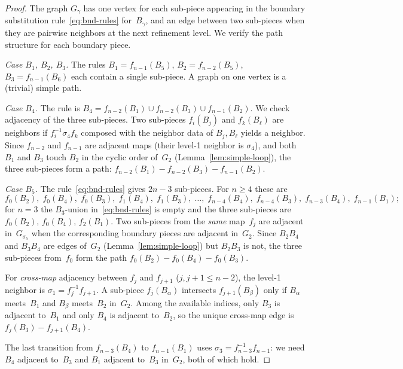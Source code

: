 \documentclass{amsart}
\theoremstyle{definition}
\theoremstyle{remark}
\begin{document}
\begin{proof}
The graph $G_\gamma$ has one vertex for each sub-piece appearing
in the boundary substitution rule~\eqref{eq:bnd-rules} for~$B_\gamma$,
and an edge between two sub-pieces when they are pairwise neighbors at
the next refinement level.  We verify the path structure for each
boundary piece.

\emph{Case $B_1$, $B_2$, $B_3$.}
The rules $B_1 = f_{n-1}(B_5)$,\; $B_2 = f_{n-2}(B_5)$,\;
$B_3 = f_{n-1}(B_6)$ each contain a single sub-piece.  A graph on one
vertex is a (trivial) simple path.

\emph{Case $B_4$.}
The rule is $B_4 = f_{n-2}(B_1) \cup f_{n-2}(B_3) \cup f_{n-1}(B_2)$.
We check adjacency of the three sub-pieces.  Two sub-pieces
$f_i(B_j)$ and $f_k(B_\ell)$ are neighbors if $f_i^{-1}\sigma_4 f_k$
composed with the neighbor data of $B_j, B_\ell$ yields a neighbor.
Since $f_{n-2}$ and $f_{n-1}$ are adjacent maps (their level-1
neighbor is $\sigma_4$), and both $B_1$ and $B_3$ touch $B_2$
in the cyclic order of~$G_2$ (Lemma~\ref{lem:simple-loop}), the
three sub-pieces form a path:
$f_{n-2}(B_1) - f_{n-2}(B_3) - f_{n-1}(B_2)$.

\emph{Case $B_5$.}
The rule~\eqref{eq:bnd-rules} gives $2n{-}3$ sub-pieces.  For $n \ge 4$
these are
\[
  f_0(B_2),\; f_0(B_4),\; f_0(B_3),\;
  f_1(B_4),\; f_1(B_3),\; \ldots,\;
  f_{n-4}(B_4),\; f_{n-4}(B_3),\;
  f_{n-3}(B_4),\; f_{n-1}(B_1);
\]
for $n = 3$ the $B_3$-union in~\eqref{eq:bnd-rules} is empty and the
three sub-pieces are $f_0(B_2),\, f_0(B_4),\, f_2(B_1)$.
Two sub-pieces from the \emph{same} map~$f_j$ are adjacent in~$G_{\sigma_5}$
when the corresponding boundary pieces are adjacent in~$G_2$.
Since $B_2 B_4$ and $B_3 B_4$ are edges of~$G_2$
(Lemma~\ref{lem:simple-loop}) but $B_2 B_3$ is not,
the three sub-pieces from~$f_0$ form the path
$f_0(B_2) - f_0(B_4) - f_0(B_3)$.

For \emph{cross-map} adjacency between $f_j$ and $f_{j+1}$
($j, j{+}1 \le n{-}2$), the level-1 neighbor is
$\sigma_1 = f_j^{-1} f_{j+1}$.
A sub-piece $f_j(B_\alpha)$ intersects $f_{j+1}(B_\beta)$ only
if $B_\alpha$ meets~$B_1$ and $B_\beta$ meets~$B_2$ in~$G_2$.
Among the available indices, only $B_3$ is adjacent to~$B_1$ and
only $B_4$ is adjacent to~$B_2$, so the unique cross-map edge is
$f_j(B_3) - f_{j+1}(B_4)$.

The last transition from $f_{n-3}(B_4)$ to $f_{n-1}(B_1)$ uses
$\sigma_3 = f_{n-3}^{-1}f_{n-1}$: we need $B_4$ adjacent to~$B_3$
and $B_1$ adjacent to~$B_3$ in~$G_2$, both of which hold.


\end{proof}
\end{document}
